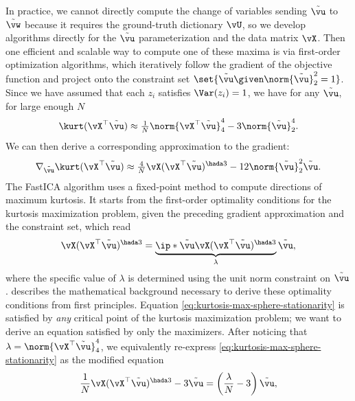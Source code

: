 \documentclass[../../book-main.tex]{subfiles}
\begin{document}
In practice, we cannot directly compute the change of variables sending
$\tilde{\vu}$ to $\tilde{\vw}$ because it requires the ground-truth dictionary
$\vU$, so we develop algorithms directly for the $\tilde{\vu}$ parameterization
and the data matrix $\vX$.
Then one efficient and scalable way to compute one of these maxima is via
first-order optimization algorithms, which iteratively follow the
gradient of the objective function and project onto the constraint
set $\set{\tilde{\vu} \given \norm{\tilde{\vu}}_2^2 = 1}$.
Since we have assumed that each $z_i$ satisfies $\Var(z_i)=1$, we
have for any $\tilde{\vu}$, for large enough $N$
\begin{equation}\label{eq:kurtosis-approximation-l4}
    \kurt(\vX^\top \tilde{\vu})
    \approx
    \tfrac{1}{N} \norm{\vX^\top \tilde{\vu}}_4^4 - 3 \norm{\tilde{\vu}}_2^4.
\end{equation}
We can then derive a corresponding approximation to the gradient:
\begin{equation*}
    \nabla_{\tilde{\vu}} \kurt(\vX^\top \tilde{\vu})
    \approx
    \tfrac{4}{N} \vX (\vX^\top \tilde{\vu})^{\hada 3}
    - 12 \norm{\tilde{\vu}}_2^2 \tilde{\vu}.
\end{equation*}
The FastICA algorithm uses a fixed-point method to compute directions
of maximum kurtosis. It starts from the first-order optimality
conditions for the kurtosis maximization problem, given the preceding
gradient approximation and the constraint set, which read
\begin{align}\label{eq:kurtosis-max-sphere-stationarity}
    \vX (\vX^\top \tilde{\vu})^{\hada 3}
    =
    \underbrace{
        \ip*{\tilde{\vu}}{
            \vX (\vX^\top \tilde{\vu})^{\hada 3}
    }}_{\lambda} \tilde{\vu},
\end{align}
where the specific value of $\lambda$ is determined using the unit
norm constraint on $\tilde{\vu}$.
 describes the mathematical background
necessary to derive these optimality conditions from first principles.
Equation \eqref{eq:kurtosis-max-sphere-stationarity} is satisfied by
\textit{any} critical point of the kurtosis maximization problem; we
want to derive an equation satisfied by only the maximizers.
After noticing that $\lambda = \norm{\vX^\top \tilde{\vu}}_4^4$, we
equivalently re-express \eqref{eq:kurtosis-max-sphere-stationarity}
as the modified equation
\begin{align}\label{eq:kurtosis-max-sphere-stationarity-modified}
    \frac{1}{N}\vX (\vX^\top \tilde{\vu})^{\hada 3}
    -
    3 \tilde{\vu}
    =
    \left(
        \frac{\lambda}{N} - 3
    \right)
    \tilde{\vu},
\end{align}
\end{document}
